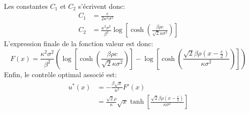 Les constantes $C_1$ et $C_2$ s'écrivent donc:
\[
    \begin{aligned}
        C_1&=\frac{c}{2 \kappa ^2 \sigma ^2}\\
        C_2&=\frac{\kappa ^2 \sigma ^2 }{\beta ^2}\log \left[\cosh\left(\frac{\beta\rho c}{\sqrt{2}\kappa\sigma^2}\right)\right]
    \end{aligned}
\]
L'expression finale de la fonction valeur est donc:
\begin{equation}\label{sol_control_2}
    F(x)=\frac{\kappa ^2 \sigma ^2 }{\beta ^2}\left(\log \left[\cosh\left(\frac{\beta\rho c}{\sqrt{2}\kappa\sigma^2}\right)\right]-\log \left[\cosh \left(\frac{\sqrt{2} \beta  \rho  \left(x-\frac{c}{2}\right)}{\kappa  \sigma ^2}\right)\right]\right)
\end{equation}
Enfin, le contrôle optimal associé est:
\begin{equation}\label{optimal_control2}
    \begin{aligned}
        u^*(x)&=-\frac{\beta\sqrt{x}}{\kappa^2}F'(x)\\
        &=\frac{\sqrt{2} \rho}{\kappa}  \sqrt{x} \tanh \left[\frac{\sqrt{2} \beta  \rho  \left(x-\frac{c}{2}\right)}{\kappa  \sigma ^2}\right]
    \end{aligned}
\end{equation}
